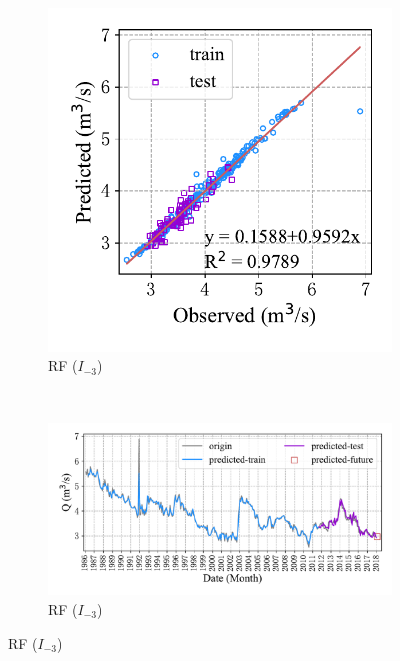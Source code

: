 \begin{figure}[!htbp]
\begin{subfigure}[b]{0.615\textwidth}
  \end{subfigure}
  \\
  \begin{subfigure}[b]{0.305\textwidth}
    \includegraphics[width=\textwidth]{Img/chap4_spr/spr_scatter_in_3_out_1_rf.pdf}
    \vspace{-1.2cm}
    \caption{RF ($I_{-3}$)}
    \label{fig:spr_scatter_in_3_out_1_rf}
  \end{subfigure}
  ~
  \begin{subfigure}[b]{0.615\textwidth}
    \includegraphics[width=\textwidth]{Img/chap4_spr/spr_series_in_3_out_1_rf.pdf}
    \vspace{-1.2cm}
    \caption{RF ($I_{-3}$)}
    \label{fig:spr_series_in_3_out_1_rf}

\end{subfigure}
\end{figure}
